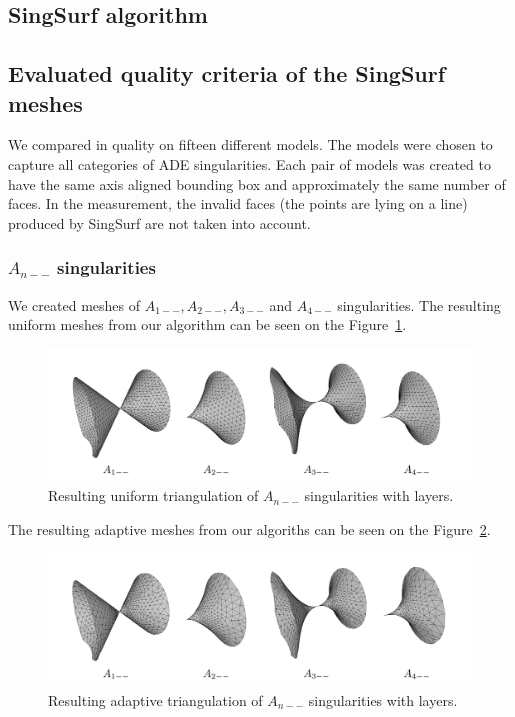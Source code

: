 \subsection{SingSurf algorithm}
\subsection{Evaluated quality criteria of the SingSurf meshes}
We compared in quality on fifteen different models. The models were chosen
to capture all categories of ADE singularities. Each pair of models was 
created to have the same axis aligned bounding box and approximately the
same number of faces. In the measurement, the invalid faces 
(the points are lying on a line) produced by SingSurf are not taken into 
account.

\subsubsection*{$A_{n--}$ singularities}
We created meshes of $A_{1--}, A_{2--}, A_{3--}$ and $A_{4--}$ singularities.
The resulting uniform meshes from our algorithm can be seen on the 
Figure~\ref{img:61}.

\begin{figure}
    \centerline{\includegraphics[scale=0.24]{images/img61}}
    \caption[Resulting uniform triangulation of $A_{n--}$ singularities]
    {Resulting uniform triangulation of $A_{n--}$ singularities with layers.}
    \label{img:61}
\end{figure} 
The resulting adaptive meshes from our algoriths can be seen on the 
Figure~\ref{img:60}.
 
\begin{figure}
    \centerline{\includegraphics[scale=0.5]{images/img60}}
    \caption[Resulting adaptive triangulation of $A_{n--}$ singularities]
    {Resulting adaptive triangulation of $A_{n--}$ singularities with layers.}
    \label{img:60}
\end{figure}

